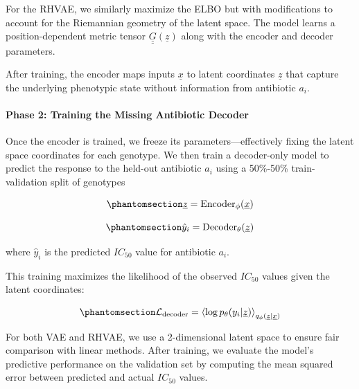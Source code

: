 \documentclass[
]{scrartcl}
\let\oldparagraph\paragraph
\renewcommand{\paragraph}[1]{\oldparagraph{#1}\mbox{}}
\begin{document}
\begin{refsection}
For the RHVAE, we similarly maximize the ELBO but with modifications to
account for the Riemannian geometry of the latent space. The model
learns a position-dependent metric tensor
\(\underline{\underline{G}}(\underline{z})\) along with the encoder and
decoder parameters.

After training, the encoder maps inputs \(\underline{x}\) to latent
coordinates \(\underline{z}\) that capture the underlying phenotypic
state without information from antibiotic \(a_i\).

\paragraph{Phase 2: Training the Missing Antibiotic
Decoder}\label{phase-2-training-the-missing-antibiotic-decoder}

Once the encoder is trained, we freeze its parameters---effectively
fixing the latent space coordinates for each genotype. We then train a
decoder-only model to predict the response to the held-out antibiotic
\(a_i\) using a 50\%-50\% train-validation split of genotypes

\begin{equation}\phantomsection\label{eq-crossvalidation-vae-encoder}{
\underline{z} = \text{Encoder}_\phi(\underline{x})
}\end{equation}

\begin{equation}\phantomsection\label{eq-crossvalidation-vae-decoder}{
\hat{y}_i = \text{Decoder}_\theta(\underline{z})
}\end{equation}

where \(\hat{y}_i\) is the predicted \(IC_{50}\) value for antibiotic
\(a_i\).

This training maximizes the likelihood of the observed \(IC_{50}\)
values given the latent coordinates:

\begin{equation}\phantomsection\label{eq-crossvalidation-vae-decoder-elbo}{
\mathcal{L}_{\text{decoder}} = 
\left\langle 
    \log p_\theta(y_i|\underline{z}) 
\right\rangle_{q_\phi(\underline{z}|\underline{x})}
}\end{equation}

For both VAE and RHVAE, we use a 2-dimensional latent space to ensure
fair comparison with linear methods. After training, we evaluate the
model's predictive performance on the validation set by computing the
mean squared error between predicted and actual \(IC_{50}\) values.


\end{refsection}
\end{document}
